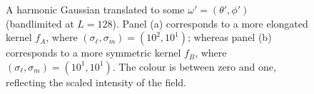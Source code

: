 \begin{figure}[htp]
	\centering
	\hfill
	\caption{
		A harmonic Gaussian translated to some \(\omega'=(\theta',\phi')\) (bandlimited at \(L=128\)).
		Panel (a) corresponds to a more elongated kernel \(f_{A}\), where \((\sigma_{\ell},\sigma_{m}) = (10^{2}, 10^{1})\); whereas panel (b) corresponds to a more symmetric kernel \(f_{B}\), where \((\sigma_{\ell},\sigma_{m}) = (10^{1}, 10^{1})\).
		The colour is between zero and one, reflecting the scaled intensity of the field.
	}\label{fig:chapter2_north_harmonic_gaussian}
\end{figure}
